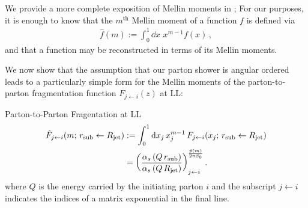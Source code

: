 We provide a more complete exposition of Mellin moments in ;
%
For our purposes, it is enough to know that the \(m^\text{th}\) Mellin moment of a function \(f\) is defined via
\begin{align}
    \hat{f}(m) := \int_0^1 \dd x \,\, x^{m-1} f(x)
    \,,
\end{align}
and that a function may be reconstructed in terms of its Mellin moments.

We now show that the assumption that our parton shower is angular ordered leads to a particularly simple form for the Mellin moments of the parton-to-parton fragmentation function \(F_{j \leftarrow i}(z)\) at LL:

\begin{proposition}{Parton-to-Parton Fragentation at LL}{}
\begin{subequations}
\begin{align}
    \label{eq:mellin_transform_defn}
    \hat{F}_{j \leftarrow i}(m;\,\rsub \leftarrow \Rjet)
    &:=
    \int_0^1 \dd x_j \, x_j^{m-1}
    \,
    F_{j \leftarrow i}(x_j;\,\rsub \leftarrow \Rjet)
    \\
    \label{eq:ll_fragmentation_function}
    &=
    \le(\frac{\alpha_s\le(Q\,\rsub\ri)}{\alpha_s\le(Q\,\Rjet\ri)}\ri)
    ^
    {\frac{\hat{p}(m)}{2\pi\beta_0}}
    _{j\leftarrow i}
    .
\end{align}
\end{subequations}
where \(Q\) is the energy carried by the initiating parton \(i\) and the subscript \(j \leftarrow i\) indicates the indices of a matrix exponential in the final line.
\end{proposition}






